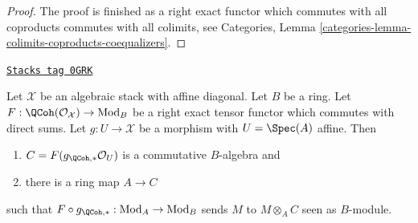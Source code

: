 \begin{proof}
\medskip\noindent
The proof is finished as a right exact functor which commutes with all
coproducts commutes with all colimits, see
Categories, Lemma \ref{categories-lemma-colimits-coproducts-coequalizers}.
\end{proof}

\begin{lemma}[Affine]
\label{stacks-more-morphisms-lemma-affine}
\href{https://stacks.math.columbia.edu/tag/0GRK}{\texttt{Stacks tag 0GRK}}

Let $\mathcal{X}$ be an algebraic stack with affine diagonal.
Let $B$ be a ring. Let $F : \QCoh(\mathcal{O}_\mathcal{X}) \to \text{Mod}_B$
be a right exact tensor functor which commutes with direct sums.
Let $g : U \to \mathcal{X}$ be a morphism with $U = \Spec(A)$ affine. Then
\begin{enumerate}
\item $C = F(g_{\QCoh, *}\mathcal{O}_U)$ is a commutative $B$-algebra and
\item there is a ring map $A \to C$
\end{enumerate}
such that $F \circ g_{\QCoh, *} : \text{Mod}_A \to \text{Mod}_B$
sends $M$ to $M \otimes_A C$ seen as $B$-module.
\end{lemma}

